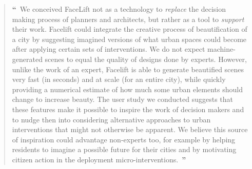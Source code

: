 \documentclass{paper}
\begin{document}
\begin{quote}
{\bf \Large ``}~We conceived FaceLift not as a technology to \emph{replace} the decision making process of planners and architects, but rather as a tool to \emph{support} their work. Facelift could integrate the creative process of beautification of a city by suggesting imagined versions of what urban spaces could become after applying certain sets of interventions. We do not expect machine-generated scenes to equal the quality of designs done by experts. However, unlike the work of an expert, Facelift is able to generate beautified scenes  very fast (in seconds) and at scale (for an entire city), while quickly providing a numerical estimate of how much some urban elements should change to increase beauty. The user study we conducted suggests that these features make it possible to inspire the work of decision makers and to nudge then into considering alternative approaches to urban interventions that might not otherwise be apparent. We believe this source of inspiration could advantage non-experts too, for example by helping residents to imagine a possible future for their cities and by motivating citizen action in the deployment micro-interventions.~{\bf \Large ''}
\end{quote}
\end{document}
